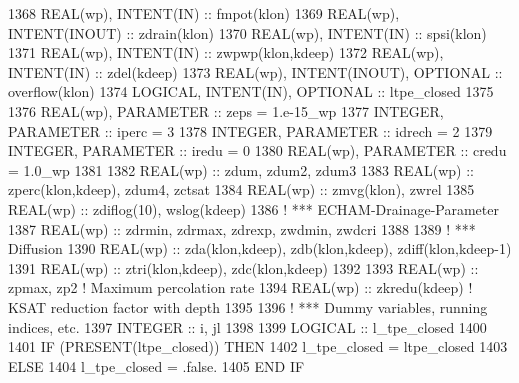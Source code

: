 \begin{DoxyCode}
1368 \textcolor{keywordtype}{REAL(wp)}, \textcolor{keywordtype}{INTENT(IN)}                     :: fmpot(klon)
1369 \textcolor{keywordtype}{REAL(wp)}, \textcolor{keywordtype}{INTENT(INOUT)}                  :: zdrain(klon)
1370 \textcolor{keywordtype}{REAL(wp)}, \textcolor{keywordtype}{INTENT(IN)}                     :: spsi(klon)
1371 \textcolor{keywordtype}{REAL(wp)}, \textcolor{keywordtype}{INTENT(IN)}                     :: zwpwp(klon,kdeep)
1372 \textcolor{keywordtype}{REAL(wp)}, \textcolor{keywordtype}{INTENT(IN)}                     :: zdel(kdeep)
1373 \textcolor{keywordtype}{REAL(wp)}, \textcolor{keywordtype}{INTENT(INOUT)}, \textcolor{keywordtype}{OPTIONAL}        :: overflow(klon)
1374 \textcolor{keywordtype}{LOGICAL},  \textcolor{keywordtype}{INTENT(IN)},    \textcolor{keywordtype}{OPTIONAL}        :: ltpe\_closed
1375 
1376 \textcolor{keywordtype}{REAL(wp)}, \textcolor{keywordtype}{PARAMETER} :: zeps   = 1.e-15\_wp
1377 \textcolor{keywordtype}{INTEGER},  \textcolor{keywordtype}{PARAMETER} :: iperc  = 3
1378 \textcolor{keywordtype}{INTEGER},  \textcolor{keywordtype}{PARAMETER} :: idrech = 2
1379 \textcolor{keywordtype}{INTEGER},  \textcolor{keywordtype}{PARAMETER} :: iredu  = 0
1380 \textcolor{keywordtype}{REAL(wp)}, \textcolor{keywordtype}{PARAMETER} :: credu  = 1.0\_wp
1381 
1382 \textcolor{keywordtype}{REAL(wp)} :: zdum, zdum2, zdum3
1383 \textcolor{keywordtype}{REAL(wp)} :: zperc(klon,kdeep), zdum4, zctsat
1384 \textcolor{keywordtype}{REAL(wp)} :: zmvg(klon), zwrel
1385 \textcolor{keywordtype}{REAL(wp)} :: zdiflog(10), wslog(kdeep)
1386 \textcolor{comment}{!     *** ECHAM-Drainage-Parameter}
1387 \textcolor{keywordtype}{REAL(wp)} :: zdrmin, zdrmax, zdrexp, zwdmin, zwdcri
1388 
1389 \textcolor{comment}{!     *** Diffusion}
1390 \textcolor{keywordtype}{REAL(wp)} :: zda(klon,kdeep), zdb(klon,kdeep), zdiff(klon,kdeep-1)
1391 \textcolor{keywordtype}{REAL(wp)} :: ztri(klon,kdeep), zdc(klon,kdeep)
1392 
1393 \textcolor{keywordtype}{REAL(wp)} :: zpmax, zp2         \textcolor{comment}{! Maximum percolation rate}
1394 \textcolor{keywordtype}{REAL(wp)} :: zkredu(kdeep)      \textcolor{comment}{! KSAT reduction factor with depth}
1395 
1396 \textcolor{comment}{!     *** Dummy variables, running indices, etc.}
1397 \textcolor{keywordtype}{INTEGER}  :: i, jl
1398 
1399 \textcolor{keywordtype}{LOGICAL}  :: l\_tpe\_closed
1400 
1401   \textcolor{keywordflow}{IF} (\textcolor{keyword}{PRESENT}(ltpe\_closed)) \textcolor{keywordflow}{THEN}
1402     l\_tpe\_closed = ltpe\_closed
1403   \textcolor{keywordflow}{ELSE}
1404     l\_tpe\_closed = .false.
1405 \textcolor{keywordflow}{  END IF}

\end{DoxyCode}
